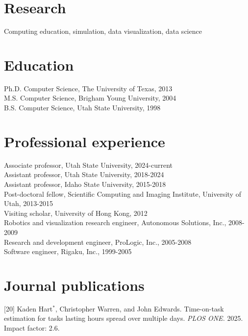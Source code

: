 \documentclass[margin,line]{res}
\newcommand{\jnum}[1]{[#1]}
\begin{document}
\begin{resume}
\section{\sc Research}

Computing education, simulation, data visualization, data science

\section{\sc Education}

Ph.D. Computer Science, The University of Texas, 2013\\
M.S. Computer Science, Brigham Young University, 2004\\
B.S. Computer Science, Utah State University, 1998\\

\section{\sc Professional experience}

Associate professor, Utah State University, 2024-current\\
Assistant professor, Utah State University, 2018-2024\\
Assistant professor, Idaho State University, 2015-2018\\
Post-doctoral fellow, Scientific Computing and Imaging
Institute, University of Utah, 2013-2015\\
Visiting scholar, University of Hong Kong, 2012\\
Robotics and visualization research engineer, Autonomous Solutions, Inc., 2008-2009\\
Research and development engineer, ProLogic, Inc., 2005-2008 \\
Software engineer, Rigaku, Inc., 1999-2005 \\


\section{\sc Journal publications}%
\jnum{20} Kaden Hart$^*$, Christopher Warren, and John Edwards. Time-on-task estimation for tasks lasting hours spread over multiple days. \textit{PLOS ONE.} 2025. Impact factor: 2.6.


\end{resume}
\end{document}
